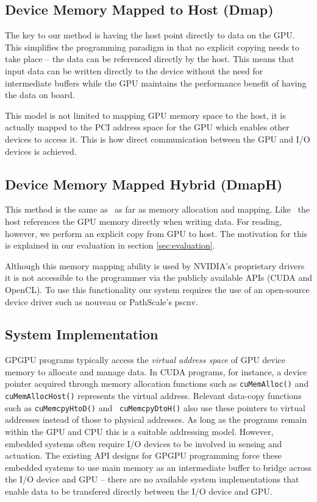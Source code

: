 \subsection{Device Memory Mapped to Host (Dmap)}
The key to our method is having the host point directly to data on the GPU.
This simplifies the programming paradigm in that no explicit copying needs
to take place -- the data can be referenced directly by the
host. This means that input data can be written directly to
the device without the need for intermediate buffers while the GPU
maintains the performance benefit of having the data on board.

This model is not limited to mapping GPU memory space to the host, it
is actually mapped to the PCI address space for the GPU which enables
other devices to access it. This is how direct communication
between the GPU and I/O devices is achieved.

\subsection{Device Memory Mapped Hybrid (DmapH)}
This method is the same as \dm\ as far as memory allocation and mapping. Like \dm\, the host references the GPU memory directly when writing data. For reading, however, we perform an explicit copy from GPU to host. The motivation for this is explained in our evaluation in section \ref{sec:evaluation}.

Although this memory mapping ability is used by NVIDIA's proprietary drivers it is not accessible to the programmer via the publicly available APIs (CUDA and OpenCL). To use this functionality our system requires the use of an open-source device driver such as nouveau or PathScale's pscnv\cite{ENZO}. 
%

\subsection{System Implementation}
\label{sec:implementation}

GPGPU programs typically access the \textit{virtual address space} of
GPU device memory to allocate and manage data.
In CUDA programs, for instance, a device pointer acquired through
memory allocation functions such as {\tt cuMemAlloc()} and {\tt
cuMemAllocHost()} represents the virtual address.
Relevant data-copy functions such as {\tt cuMemcpyHtoD()} and {\tt
cuMemcpyDtoH()} also use these pointers to virtual addresses instead of
those to physical addresses.
As long as the programs remain within the GPU and CPU this is a
suitable addressing model.
However, embedded systems often require I/O devices to be involved in
sensing and actuation.
The existing API designs for GPGPU programming force these embedded
systems to use main memory as an intermediate buffer to bridge across
the I/O device and GPU -- there are no available system
implementations that enable data to be transfered directly between the
I/O device and GPU.

